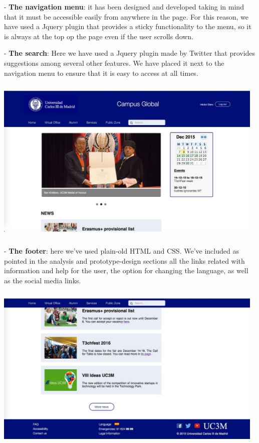 \documentclass{article}
\begin{document}
\indent\indent	- \textbf{The navigation menu}: it has been designed and developed taking in mind that it must be accessible easily from anywhere in the page. For this reason, we have used a Jquery plugin that provides a sticky functionality to the menu, so it is always at the top op the page even if the user scrolls down.

\indent\indent - \textbf{The search}: Here we have used a Jquery plugin made by Twitter that provides suggestions among several other features. We have placed it next to the navigation menu to ensure that it is easy to access at all times.

\begin{center} 
\includegraphics[width=13cm, height=8cm, keepaspectratio]{imp_homepage_top}
\end{center} 

- \textbf{The footer}: here we've used plain-old HTML and CSS. We've included as pointed in the analysis and prototype-design sections all the links related with information and help for the user, the option for changing the language, as well as the social media links.

\begin{center} 
\includegraphics[width=13cm, height=8cm, keepaspectratio]{imp_homepage_footer}
\end{center} 
\end{document}
